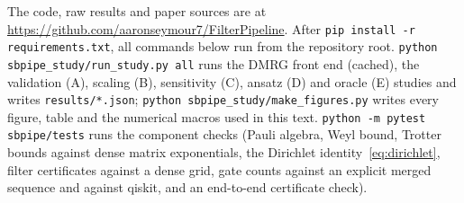 \documentclass[aps,pra,twocolumn,superscriptaddress,nofootinbib]{revtex4-2}
\begin{document}
The code, raw results and paper sources are at \url{https://github.com/aaronseymour7/FilterPipeline}. After
\texttt{pip install -r requirements.txt}, all commands below run from the repository root.
\texttt{python sbpipe\_study/run\_study.py all} runs the DMRG front end (cached), the validation (A),
scaling (B), sensitivity (C), ansatz (D) and oracle (E) studies and writes \texttt{results/*.json};
\texttt{python sbpipe\_study/make\_figures.py} writes every figure, table and the numerical macros used
in this text. \texttt{python -m pytest sbpipe/tests} runs the component checks (Pauli algebra, Weyl
bound, Trotter bounds against dense matrix exponentials, the Dirichlet identity~\eqref{eq:dirichlet},
filter certificates against a dense grid, gate counts against an explicit merged sequence and against
qiskit, and an end-to-end certificate check).
\end{document}
